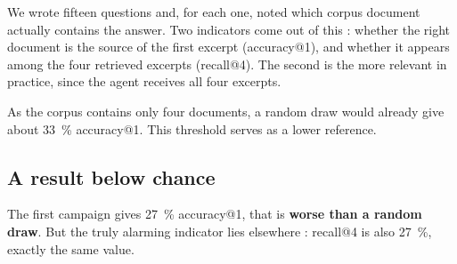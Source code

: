 We wrote fifteen questions and, for each one, noted which corpus document
actually contains the answer. Two indicators come out of this : whether the right
document is the source of the first excerpt (accuracy@1), and whether it appears
among the four retrieved excerpts (recall@4). The second is the more relevant in practice,
since the agent receives all four excerpts.

As the corpus contains only four documents, a random draw would already give
about \SI{33}{\percent} accuracy@1. This threshold serves as a lower reference.

\subsection{A result below chance}

The first campaign gives \SI{27}{\percent} accuracy@1, that is \textbf{worse
than a random draw}. But the truly alarming indicator lies elsewhere : recall@4
is also \SI{27}{\percent}, exactly the same value.
